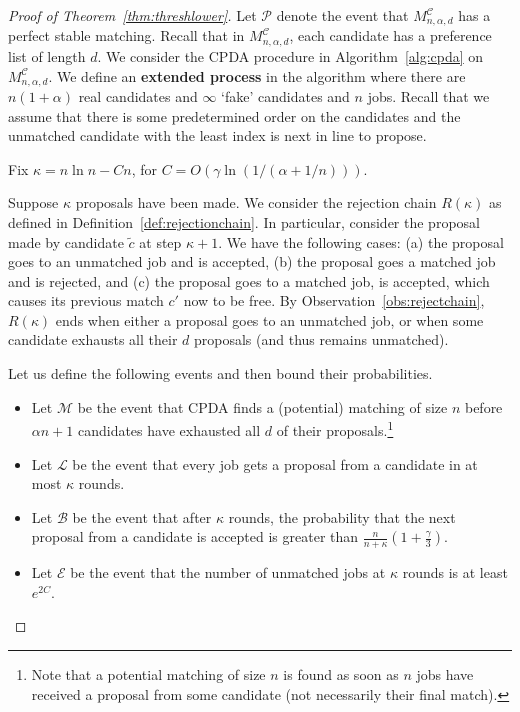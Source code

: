 \documentclass[11pt]{amsart}
\newcommand{\cal}[1]{\mathcal{#1}}
\newcommand{\defn}{\textbf}
\begin{document}
\begin{proof}[Proof of Theorem~\ref{thm:threshlower}]

Let $\mathcal{P}$ denote the event that $M_{n, \alpha, d}^{\cal{C}}$ has a perfect stable matching. Recall that in $M_{n, \alpha, d}^{\cal{C}}$, each candidate has a preference list of length $d$.  We consider the CPDA procedure in Algorithm~\ref{alg:cpda} on $M_{n, \alpha, d}^{\cal{C}}$.  We define an \defn{extended process} in the algorithm where there are $n(1+\alpha)$ real candidates and $\infty$ `fake' candidates and $n$ jobs. Recall that we assume that there is some predetermined order on the candidates and the unmatched candidate with the least index is next in line to propose. 

Fix $\kappa = n \ln n - C n$, for $C = O(\gamma \ln(1/(\alpha + 1/n)))$.

Suppose $\kappa$ proposals have been made.  We consider the rejection chain $R(\kappa)$ as defined in Definition~\ref{def:rejectionchain}.  
In particular, consider the proposal made by candidate $\tilde{c}$ at step $\kappa + 1$.  We have the
following cases: (a) the proposal goes to an unmatched job and is accepted, (b) the proposal
goes a matched job and is rejected, and (c) the proposal goes to a matched job, is accepted,
which causes its previous match $c'$ now to be free. 
By Observation~\ref{obs:rejectchain}, $R(\kappa)$ ends when either a proposal goes to an unmatched job, or when some candidate exhausts all their $d$ proposals (and thus remains unmatched).  


Let us define the following events and then bound their probabilities. 
\begin{itemize}
    \item Let $\mathcal{M}$ be the event that CPDA finds a (potential) matching of size $n$ before $\alpha n + 1$ candidates have exhausted all $d$ of their proposals.\footnote{Note that a potential matching of size $n$ is found as soon as $n$ jobs have received a proposal from some candidate (not necessarily their final match).}
   \item Let $\mathcal{L}$ be the event that every job gets a proposal from a candidate in at most $\kappa$ rounds.
   \item Let $\mathcal{B}$ be the event that after $\kappa$ rounds, the probability that the next proposal from a candidate is accepted is greater than $\frac{n}{n + \kappa}(1 + \frac \gamma3)$.
  \item Let $\mathcal{E}$ be the event that the number of unmatched jobs at $\kappa$ rounds is at least $e^{2C}$.  
\end{itemize}







\end{proof}
\end{document}
